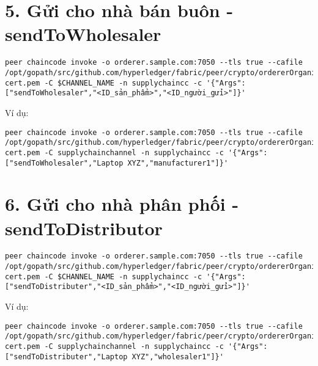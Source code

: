 \documentclass{article}
\begin{document}
\section{5. Gửi cho nhà bán buôn - sendToWholesaler}

\begin{lstlisting}[breaklines=true]
peer chaincode invoke -o orderer.sample.com:7050 --tls true --cafile /opt/gopath/src/github.com/hyperledger/fabric/peer/crypto/ordererOrganizations/sample.com/orderers/orderer.sample.com/msp/tlscacerts/tlsca.sample.com-cert.pem -C $CHANNEL_NAME -n supplychaincc -c '{"Args":["sendToWholesaler","<ID_sản_phẩm>","<ID_người_gửi>"]}'
\end{lstlisting}

Ví dụ:

\begin{lstlisting}[breaklines=true]
peer chaincode invoke -o orderer.sample.com:7050 --tls true --cafile /opt/gopath/src/github.com/hyperledger/fabric/peer/crypto/ordererOrganizations/sample.com/orderers/orderer.sample.com/msp/tlscacerts/tlsca.sample.com-cert.pem -C supplychainchannel -n supplychaincc -c '{"Args":["sendToWholesaler","Laptop XYZ","manufacturer1"]}'
\end{lstlisting}

\section{6. Gửi cho nhà phân phối - sendToDistributor}

\begin{lstlisting}[breaklines=true]
peer chaincode invoke -o orderer.sample.com:7050 --tls true --cafile /opt/gopath/src/github.com/hyperledger/fabric/peer/crypto/ordererOrganizations/sample.com/orderers/orderer.sample.com/msp/tlscacerts/tlsca.sample.com-cert.pem -C $CHANNEL_NAME -n supplychaincc -c '{"Args":["sendToDistributer","<ID_sản_phẩm>","<ID_người_gửi>"]}'
\end{lstlisting}

Ví dụ:

\begin{lstlisting}[breaklines=true]
peer chaincode invoke -o orderer.sample.com:7050 --tls true --cafile /opt/gopath/src/github.com/hyperledger/fabric/peer/crypto/ordererOrganizations/sample.com/orderers/orderer.sample.com/msp/tlscacerts/tlsca.sample.com-cert.pem -C supplychainchannel -n supplychaincc -c '{"Args":["sendToDistributer","Laptop XYZ","wholesaler1"]}'
\end{lstlisting}
\end{document}
